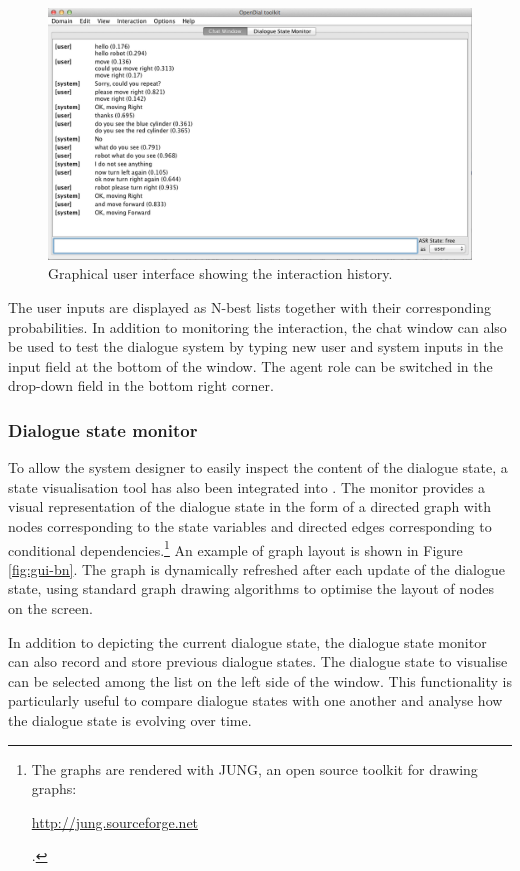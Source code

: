 \begin{figure}[h]
\centering
\includegraphics[scale=0.40]{imgs/gui-chatbox.png}
\caption{Graphical user interface showing the interaction history.}
\label{fig:gui-chatbox}
\end{figure}

  The user inputs are displayed as N-best lists together with their corresponding probabilities. In addition to monitoring the interaction, the chat window can also be used to test the dialogue system by typing new user and system inputs in the input field at the bottom of the window.  The agent role can be switched in the drop-down field in the bottom right corner. 


\subsubsection*{Dialogue state monitor}

To allow the system designer to easily inspect the content of the dialogue state, a state visualisation tool has also been integrated into \opendial{}.  The monitor provides a visual representation of the dialogue state in the form of a directed graph with nodes corresponding to the state variables and directed edges corresponding to conditional dependencies.\footnote{The graphs are rendered with JUNG, an open source toolkit for drawing graphs: \begin{scriptsize}\url{http://jung.sourceforge.net}\end{scriptsize}.} An example of graph layout is shown in Figure \ref{fig:gui-bn}. The graph is dynamically refreshed after each update of the dialogue state, using standard graph drawing algorithms to optimise the layout of nodes on the screen. 

In addition to depicting the current dialogue state, the dialogue state monitor can also record and store previous dialogue states.  The dialogue state to visualise can be selected among the list on the left side of the window. This functionality is particularly useful to compare dialogue states with one another and analyse how the dialogue state is evolving over time. 

